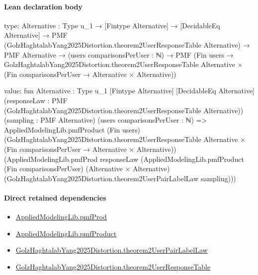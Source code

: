 \documentclass[10pt]{article}
\begin{document}
\paragraph{Lean declaration body}
\begin{ReviewVerbatim}
type:
{Alternative : Type u_1} →
  [Fintype Alternative] →
    [DecidableEq Alternative] →
      PMF (GolzHaghtalabYang2025Distortion.theorem2UserResponseTable Alternative) →
        PMF Alternative →
          (users comparisonsPerUser : ℕ) →
            PMF
              (Fin users →
                GolzHaghtalabYang2025Distortion.theorem2UserResponseTable Alternative ×
                  (Fin comparisonsPerUser → Alternative × Alternative))

value:
fun {Alternative : Type u_1} [Fintype Alternative] [DecidableEq Alternative]
    (responseLaw : PMF (GolzHaghtalabYang2025Distortion.theorem2UserResponseTable Alternative))
    (sampling : PMF Alternative) (users comparisonsPerUser : ℕ) =>
  AppliedModelingLib.pmfProduct (Fin users)
    (GolzHaghtalabYang2025Distortion.theorem2UserResponseTable Alternative ×
      (Fin comparisonsPerUser → Alternative × Alternative))
    (AppliedModelingLib.pmfProd responseLaw
      (AppliedModelingLib.pmfProduct (Fin comparisonsPerUser) (Alternative × Alternative)
        (GolzHaghtalabYang2025Distortion.theorem2UserPairLabelLaw sampling)))
\end{ReviewVerbatim}

\paragraph{Direct retained dependencies}
\begin{itemize}\raggedright
\item \hyperlink{library-prerequisite-de8e2a8bfe221a38}{Applied\allowbreak{}Modeling\allowbreak{}Lib.\allowbreak{}pmf\allowbreak{}Prod}
\item \hyperlink{governing-declaration-5ac12d0a52b69068}{Applied\allowbreak{}Modeling\allowbreak{}Lib.\allowbreak{}pmf\allowbreak{}Product}
\item \hyperlink{governing-declaration-98c3ee9a11a59ef9}{Golz\allowbreak{}Haghtalab\allowbreak{}Yang2025\allowbreak{}Distortion.\allowbreak{}theorem2\allowbreak{}User\allowbreak{}Pair\allowbreak{}Label\allowbreak{}Law}
\item \hyperlink{governing-declaration-c5d0273cbd7ddcc9}{Golz\allowbreak{}Haghtalab\allowbreak{}Yang2025\allowbreak{}Distortion.\allowbreak{}theorem2\allowbreak{}User\allowbreak{}Response\allowbreak{}Table}
\end{itemize}
\hypertarget{governing-declaration-71b9e9aed968af43}{}
\end{document}
